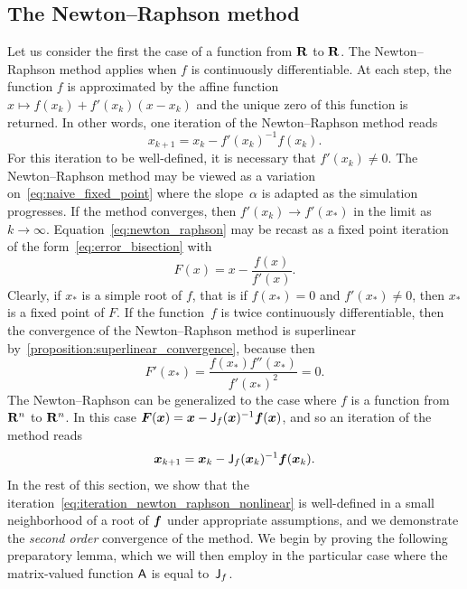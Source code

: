 \subsection{The Newton--Raphson method}
Let us consider the first the case of a function from $\mathbf R$ to $\mathbf R$.
The Newton--Raphson method applies when $f$ is continuously differentiable.
At each step, the function $f$ is approximated by the affine function
$x \mapsto f(x_k) + f'(x_k) (x - x_k)$ and the unique zero of this function is returned.
In other words, one iteration of the Newton--Raphson method reads
\begin{equation}
    \label{eq:newton_raphson}
    x_{k+1} = x_k - f'(x_k)^{-1} f(x_k).
\end{equation}
For this iteration to be well-defined,
it is necessary that $f'(x_k) \neq 0$.
The Newton--Raphson method may be viewed as a variation on~\eqref{eq:naive_fixed_point} where the slope~$\alpha$ is adapted as the simulation progresses.
If the method converges, then $f'(x_k) \to f'(x_*)$ in the limit as $k \to \infty$.
Equation~\eqref{eq:newton_raphson} may be recast as a fixed point iteration of the form~\eqref{eq:error_bisection} with
\[
    F(x) = x - \frac{f(x)}{f'(x)}.
\]
Clearly, if $x_*$ is a simple root of $f$, that is if $f(x_*) = 0$ and $f'(x_*) \neq 0$,
then $x_*$ is a fixed point of $F$.
If the function~$f$ is twice continuously differentiable,
then the convergence of the Newton--Raphson method is superlinear by~\cref{proposition:superlinear_convergence},
because then
\[
    F'(x_*) = \frac{f(x_*) f''(x_*)}{f'(x_*)^2} = 0.
\]
The Newton--Raphson can be generalized to the case where $f$ is a function from $\mathbf R^n$ to $\mathbf R^n$.
In this case $\mathbf{\boldsymbol{F}}(\mathbf{\boldsymbol{x}}) = \mathbf{\boldsymbol{x}} - \mathsf J_f(\mathbf{\boldsymbol{x}})^{-1} \mathbf{\boldsymbol{f}}(\mathbf{\boldsymbol{x}})$,
and so an iteration of the method reads
\begin{equation}
    \label{eq:iteration_newton_raphson_nonlinear}
    \mathbf{\boldsymbol{x}}_{k+1} = \mathbf{\boldsymbol{x}}_k - \mathsf J_f(\mathbf{\boldsymbol{x}}_k)^{-1} \mathbf{\boldsymbol{f}}(\mathbf{\boldsymbol{x}}_k).
\end{equation}
In the rest of this section,
we show that the iteration~\eqref{eq:iteration_newton_raphson_nonlinear} is well-defined in a small neighborhood of a root of $\mathbf{\boldsymbol{f}}$ under appropriate assumptions,
and we demonstrate the \emph{second order} convergence of the method.
We begin by proving the following preparatory lemma,
which we will then employ in the particular case where the matrix-valued function $\mathsf A$ is equal to~$\mathsf J_f$.
